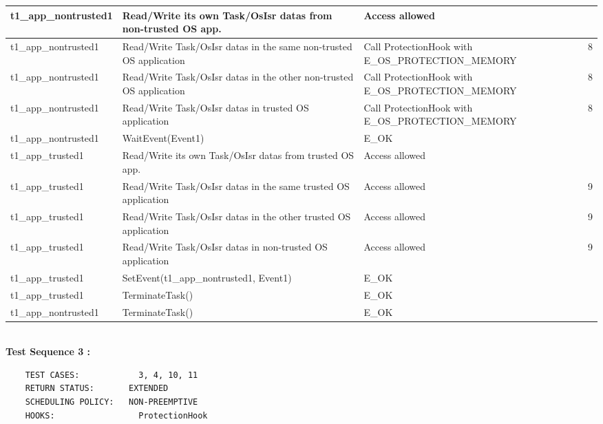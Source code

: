 \documentclass[10pt]{article}
\newlength{\Li}\settowidth{\Li}{Running}
\newlength{\Lii}\setlength{\Lii}{7cm}
\newlength{\Liiii}\setlength{\Liiii}{0.9cm}
\newlength{\Liii}\setlength{\Liii}{\textwidth} \addtolength{\Liii}{-\Li} \addtolength{\Liii}{-\Lii} \addtolength{\Liii}{-\Liiii}
\begin{document}
	\begin{supertabular}{|p{\Li}|p{\Lii}|p{\Liii}|p{\Liiii}|} \hline 
	t1\_app\_nontrusted1	& Read/Write its own Task/OsIsr datas from non-trusted OS app.	& Access allowed									& \\ \hline
	t1\_app\_nontrusted1	& Read/Write Task/OsIsr datas in the same non-trusted OS application 	& Call ProtectionHook with E\_OS\_PROTECTION\_MEMORY	& 8 \\ \hline
	t1\_app\_nontrusted1	& Read/Write Task/OsIsr datas in the other non-trusted OS application 	& Call ProtectionHook with E\_OS\_PROTECTION\_MEMORY	& 8 \\ \hline
	t1\_app\_nontrusted1	& Read/Write Task/OsIsr datas in trusted OS application			 & Call ProtectionHook with E\_OS\_PROTECTION\_MEMORY	& 8 \\ \hline
	t1\_app\_nontrusted1	& WaitEvent(Event1)										& E\_OK											& \\ \hline
	
	t1\_app\_trusted1		& Read/Write its own Task/OsIsr datas from trusted OS app.		& Access allowed									& \\ \hline
	t1\_app\_trusted1		& Read/Write Task/OsIsr datas in the same trusted OS application 	& Access allowed									& 9 \\ \hline
	t1\_app\_trusted1		& Read/Write Task/OsIsr datas in the other trusted OS application 	& Access allowed									& 9 \\ \hline
	t1\_app\_trusted1		& Read/Write Task/OsIsr datas in non-trusted OS application	 	& Access allowed									& 9 \\ \hline
	t1\_app\_trusted1		& SetEvent(t1\_app\_nontrusted1, Event1)					& E\_OK											& \\ \hline
	
	t1\_app\_trusted1		& TerminateTask()										& E\_OK											& \\ \hline
	t1\_app\_nontrusted1	& TerminateTask()										& E\_OK											& \\ \hline
	\end{supertabular}\\

	\textbf{Test Sequence 3 :}
	\begin{lstlisting}
	TEST CASES:		       3, 4, 10, 11
	RETURN STATUS:	  	 EXTENDED
	SCHEDULING POLICY:   NON-PREEMPTIVE
	HOOKS:		           ProtectionHook
	\end{lstlisting}
	
\end{document}

